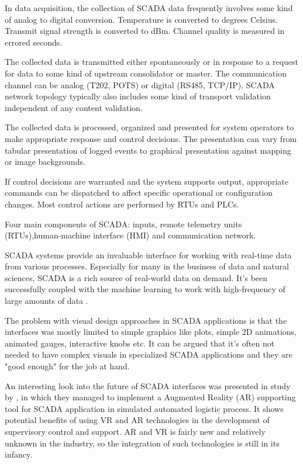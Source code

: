 In data acquisition, the collection of SCADA data frequently involves some kind of analog to digital conversion. Temperature is converted to degrees Celsius. Transmit signal strength is converted to dBm. Channel quality is measured in errored seconds. 

The collected data is transmitted either spontaneously or in response to a request for data to some kind of upstream consolidator or master. The communication channel can be analog (T202, POTS) or digital (RS485, TCP/IP). SCADA network topology typically also includes some kind of transport validation independent of any content validation.


The collected data is processed, organized and presented for system operators to make appropriate response and control decisions. The presentation can vary from tabular presentation of logged events to graphical presentation against mapping or image backgrounds.

If control decisions are warranted and the system supports output, appropriate commands can be dispatched to affect specific operational or configuration changes. Most control actions are performed by RTUs and PLCs.

Four main components of SCADA: inputs, remote telemetry units (RTUs),human-machine interface (HMI) and communication network.


SCADA systems provide an invaluable interface for working with real-time data from various processes. Especially for many in the business of data and natural sciences, SCADA is a rich source of real-world data on demand. It's been successfully coupled with the machine learning to work with high-frequency of large amounts of data \citep{linWindPowerPrediction2020}. 

The problem with visual design approaches in SCADA applications is that the interfaces was mostly limited to simple graphics like plots, simple 2D animations, animated gauges, interactive knobs etc. It can be argued that it's often not needed to have complex visuals in specialized SCADA applications and they are "good enough" for the job at hand.


An interesting look into the future of SCADA interfaces was presented in study by \cite{soeteMixedRealitySCADA2015}, in which they managed to implement a Augmented Reality (AR) supporting tool for SCADA application in simulated automated logistic process. It shows potential benefits of using VR and AR technologies in the development of supervisory control and support. AR and VR is fairly new and relatively unknown in the industry, so the integration of such technologies is still in its infancy.


